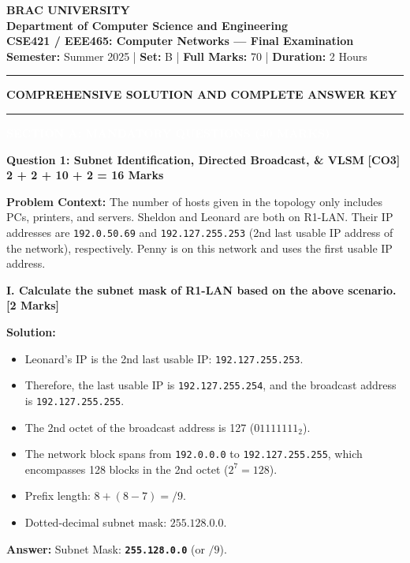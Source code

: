 \documentclass[11pt,a4paper]{article}
\newcommand{\questionheader}[3]{
    \vspace{0.35cm}
    \noindent\colorbox{qboxbg}{
        \parbox{\dimexpr\textwidth-2\fboxsep\relax}{
            \textbf{\textcolor{primary}{\large #1}} \hfill \textbf{\textcolor{accent}{[#2]}} \hfill \textbf{\textcolor{secondary}{#3 Marks}}
        }
    }
    \vspace{0.15cm}
}
\newcommand{\sectionbanner}[1]{
    \vspace{0.5cm}
    \noindent\colorbox{primary}{
        \parbox{\dimexpr\textwidth-2\fboxsep\relax}{
            \centering \textbf{\textcolor{white}{\Large #1}}
        }
    }
    \vspace{0.25cm}
}
\begin{document}
\begin{center}
    {\LARGE \textbf{\textcolor{primary}{BRAC UNIVERSITY}}}\\[4pt]
    {\large \textbf{Department of Computer Science and Engineering}}\\[3pt]
    {\textbf{CSE421 / EEE465: Computer Networks --- Final Examination}}\\[2pt]
    \textbf{Semester:} Summer 2025 \quad | \quad \textbf{Set:} B \quad | \quad \textbf{Full Marks:} 70 \quad | \quad \textbf{Duration:} 2 Hours\\[2pt]
    \rule{\textwidth}{1.5pt}
    {\large \textbf{\textcolor{secondary}{COMPREHENSIVE SOLUTION AND COMPLETE ANSWER KEY}}}
    \rule{\textwidth}{0.8pt}
\end{center}

\sectionbanner{SECTION A: MANDATORY QUESTIONS (40 MARKS)}

\questionheader{Question 1: Subnet Identification, Directed Broadcast, \& VLSM}{CO3}{2 + 2 + 10 + 2 = 16}

\textbf{Problem Context:}
The number of hosts given in the topology only includes PCs, printers, and servers. Sheldon and Leonard are both on R1-LAN. Their IP addresses are \texttt{192.0.50.69} and \texttt{192.127.255.253} (2nd last usable IP address of the network), respectively. Penny is on this network and uses the first usable IP address.

\textbf{I. Calculate the subnet mask of R1-LAN based on the above scenario. [2 Marks]}

\textbf{Solution:}
\begin{itemize}
    \item Leonard's IP is the 2nd last usable IP: \texttt{192.127.255.253}.
    \item Therefore, the last usable IP is \texttt{192.127.255.254}, and the broadcast address is \texttt{192.127.255.255}.
    \item The 2nd octet of the broadcast address is 127 ($01111111_2$).
    \item The network block spans from \texttt{192.0.0.0} to \texttt{192.127.255.255}, which encompasses 128 blocks in the 2nd octet ($2^7 = 128$).
    \item Prefix length: $8 + (8 - 7) = /9$.
    \item Dotted-decimal subnet mask: $\mathbf{255.128.0.0}$.
\end{itemize}
\textbf{Answer:} Subnet Mask: \textbf{\texttt{255.128.0.0}} (or $/9$).
\end{document}
